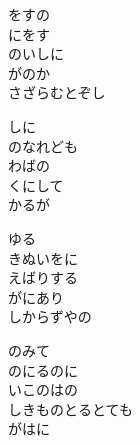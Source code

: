 \documentclass[10pt,b5j]{tarticle} %
\begin{document}
\vspace{1.5em} %
\newcommand{\linespace}{0.5em} %
\newcommand{\blocksize}{0.5\hsize} %
\begin{enumerate} %
    \begin{minipage}[c]{\blocksize}
    
        \vspace{\linespace}
        \item
        をすの\\
        にをす\\
        のいしに\\
        がのか\\
        さざらむとぞし
        
        \vspace{\linespace}
        \item
        しに\\
        のなれども\\
        わばの\\
        くにして\\
        かるが
        
        \vspace{\linespace}
        \item
        ゆる\\
        きぬいをに\\
        えばりする\\
        がにあり\\
        しからずやの
        
        \vspace{\linespace}
        \item
        のみて\\
        のにるのに\\
        いこのはの\\
        しきものとるとても\\
        がはに
    
    \end{minipage}
\end{enumerate} %
\end{document}
